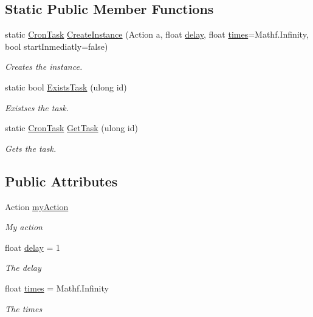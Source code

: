 \subsection*{Static Public Member Functions}
\begin{DoxyCompactItemize}
\item 
static \hyperlink{class_lerp2_a_p_i_1_1_cron_task}{Cron\+Task} \hyperlink{class_lerp2_a_p_i_1_1_cron_task_afdac73f7e3ba9edf60723ede8e28cf29}{Create\+Instance} (Action a, float \hyperlink{class_lerp2_a_p_i_1_1_cron_task_a58cdee6758ca49fa0a1c1f00eb71bdf3}{delay}, float \hyperlink{class_lerp2_a_p_i_1_1_cron_task_a1118024b2ed058a9189b530648de579c}{times}=Mathf.\+Infinity, bool start\+Inmediatly=false)
\begin{DoxyCompactList}\small\item\em Creates the instance. \end{DoxyCompactList}\item 
static bool \hyperlink{class_lerp2_a_p_i_1_1_cron_task_a7556cf18640f5081717840d8e8f4d35f}{Exists\+Task} (ulong id)
\begin{DoxyCompactList}\small\item\em Existses the task. \end{DoxyCompactList}\item 
static \hyperlink{class_lerp2_a_p_i_1_1_cron_task}{Cron\+Task} \hyperlink{class_lerp2_a_p_i_1_1_cron_task_ab9498ba4ec1aed3465f2b67a53ca5d58}{Get\+Task} (ulong id)
\begin{DoxyCompactList}\small\item\em Gets the task. \end{DoxyCompactList}\end{DoxyCompactItemize}
\subsection*{Public Attributes}
\begin{DoxyCompactItemize}
\item 
Action \hyperlink{class_lerp2_a_p_i_1_1_cron_task_a4c4b35ea4dd55fd5a7f1d2eabeb72d66}{my\+Action}
\begin{DoxyCompactList}\small\item\em My action \end{DoxyCompactList}\item 
float \hyperlink{class_lerp2_a_p_i_1_1_cron_task_a58cdee6758ca49fa0a1c1f00eb71bdf3}{delay} = 1
\begin{DoxyCompactList}\small\item\em The delay \end{DoxyCompactList}\item 
float \hyperlink{class_lerp2_a_p_i_1_1_cron_task_a1118024b2ed058a9189b530648de579c}{times} = Mathf.\+Infinity
\begin{DoxyCompactList}\small\item\em The times \end{DoxyCompactList}\end{DoxyCompactItemize}
